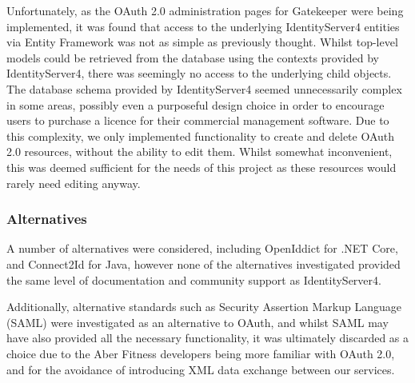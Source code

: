 Unfortunately, as the OAuth 2.0 administration pages for Gatekeeper were being implemented, it was found that access to the underlying IdentityServer4 entities via Entity Framework was not as simple as previously thought. Whilst top-level models could be retrieved from the database using the contexts provided by IdentityServer4, there was seemingly no access to the underlying child objects. The database schema provided by IdentityServer4 seemed unnecessarily complex in some areas, possibly even a purposeful design choice in order to encourage users to purchase a licence for their commercial management software\cite{identityserver4adminui}. Due to this complexity, we only implemented functionality to create and delete OAuth 2.0 resources, without the ability to edit them. Whilst somewhat inconvenient, this was deemed sufficient for the needs of this project as these resources would rarely need editing anyway.

\subsubsection{Alternatives}

A number of alternatives were considered, including OpenIddict\cite{openiddict} for .NET Core, and Connect2Id\cite{connect2id} for Java, however none of the alternatives investigated provided the same level of documentation and community support as IdentityServer4.

Additionally, alternative standards such as Security Assertion Markup Language (SAML) were investigated as an alternative to OAuth, and whilst SAML may have also provided all the necessary functionality, it was ultimately discarded as a choice due to the Aber Fitness developers being more familiar with OAuth 2.0, and for the avoidance of introducing XML data exchange between our services.
